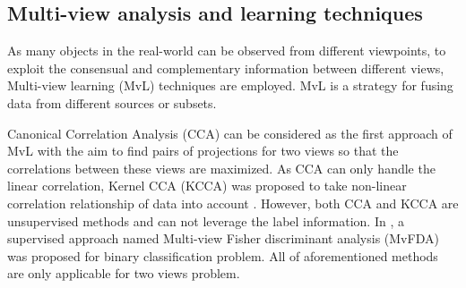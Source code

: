 
    \subsection{Multi-view analysis and learning techniques}
        As many objects in the real-world can be observed from different viewpoints, to exploit the consensual and complementary information between different views, Multi-view learning (MvL) techniques are employed.
        MvL is a strategy for fusing data from different sources or subsets.

        Canonical Correlation Analysis (CCA) \cite{Hotelling} can be considered as the first approach of MvL with the aim to find pairs of projections for two views so that the correlations between these views are maximized.
        As CCA can only handle the linear correlation, Kernel CCA (KCCA) was proposed to take non-linear correlation relationship of data into account \cite{Akaho2006}.
        However, both CCA and KCCA are unsupervised methods and can not leverage the label information.
        In \cite{diethe2008multiview}, a supervised approach named Multi-view Fisher discriminant analysis (MvFDA) was proposed for binary classification problem.
        All of aforementioned methods are only applicable for two views problem.


